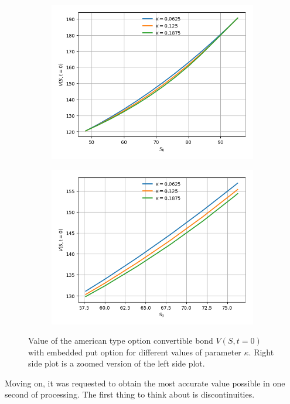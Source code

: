 \documentclass{article}
\begin{document}
\begin{figure}[!bh]
\begin{minipage}{.5\textwidth}
  \centering
  \begin{subfigure}{\textwidth}
      \includegraphics[width=\textwidth,center]{../images/complete_american_varying_s_varying_k.png}
  \end{subfigure}
\end{minipage}
\begin{minipage}{.5\textwidth}
  \centering
  \begin{subfigure}{\textwidth}
      \includegraphics[width=\textwidth,center]{../images/american_varying_s_varying_k.png}
  \end{subfigure}
\end{minipage}
\caption{Value of the american type option convertible bond $V(S,t=0)$ with embedded put option for different values of parameter $\kappa$. Right side plot is a zoomed version of the left side plot.}
\label{fig:american_varying_s_varying_k}
\end{figure}
\par Moving on, it was requested to obtain the most accurate value possible in one second of processing.
The first thing to think about is discontinuities.
\clearpage


\clearpage
\end{document}
